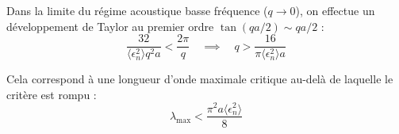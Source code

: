 Dans la limite du régime acoustique basse fréquence ($q \to 0$), on effectue un développement de Taylor au premier ordre $\tan(qa/2) \sim qa/2$ :
\begin{equation}
    \frac{32}{\langle\epsilon_n^2\rangle q^2 a} < \frac{2\pi}{q} \quad \implies \quad q > \frac{16}{\pi \langle\epsilon_n^2\rangle a}
\end{equation}

Cela correspond à une longueur d'onde maximale critique au-delà de laquelle le critère est rompu :
\begin{equation}
    \lambda_{\text{max}} < \frac{\pi^2 a \langle\epsilon_n^2\rangle}{8}
\end{equation}
